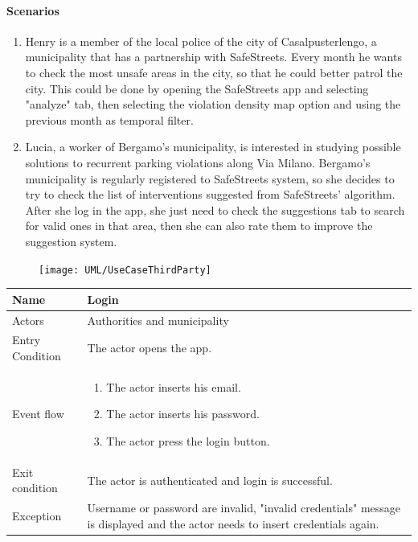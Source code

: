\paragraph{Scenarios}
\begin{enumerate}
    \item Henry is a member of the local police of the city of Casalpusterlengo, a municipality that has a partnership with SafeStreets. Every month he wants to check the most unsafe areas in the city, so that he could better patrol the city. This could be done by opening the SafeStreets app and selecting "analyze" tab, then selecting the violation density map option and using the previous month as temporal filter.
    
    \item Lucia, a worker of Bergamo's municipality, is interested in studying possible solutions to recurrent parking violations along Via Milano. Bergamo's municipality is regularly registered to SafeStreets system, so she decides to try to check the list of interventions suggested from SafeStreets' algorithm. After she log in the app, she just need to check the suggestions tab to search for valid ones in that area, then she can also rate them to improve the suggestion system.
\end{enumerate}

\begin{figure}[H]
        \centering
        \texttt{[image: UML/UseCaseThirdParty]}
\end{figure}

\vskip 0.2in
\begin{tabular}{|p{3.1cm}|p{11.6cm}|}
\hline
Name & Login\\
\hline
Actors & Authorities and municipality\\
\hline
Entry Condition & The actor opens the app.\\
\hline
Event flow & \begin{enumerate}
                \item The actor inserts his email.
                \item The actor inserts his password.
                \item The actor press the login button.
            \end{enumerate}\\
\hline
Exit condition & The actor is authenticated and login is successful.\\
\hline
Exception & Username or password are invalid, "invalid credentials" message is displayed and the actor needs to insert credentials again.\\
\hline
\end{tabular}

